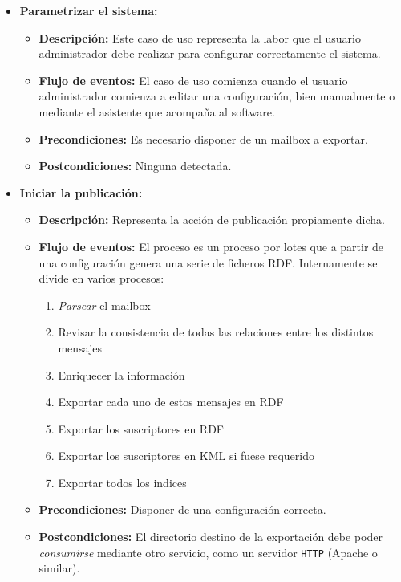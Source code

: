 \begin{itemize}

  \item \textbf{Parametrizar el sistema:}
 	\begin{itemize}
 	  \item \textbf{Descripción:} Este caso de uso representa la labor 
		que el usuario administrador debe realizar para configurar 
		correctamente el sistema.
 	  \item \textbf{Flujo de eventos:} El caso de uso comienza cuando el
		usuario administrador comienza a editar una configuración, 
		bien manualmente o mediante el asistente que acompaña al 
		software.
	  \item \textbf{Precondiciones:} Es necesario disponer de un mailbox
		a exportar.
	  \item \textbf{Postcondiciones:} Ninguna detectada.
	\end{itemize}

  \item \textbf{Iniciar la publicación:}
 	\begin{itemize}
 	  \item \textbf{Descripción:} Representa la acción de publicación 
		propiamente dicha.
 	  \item \textbf{Flujo de eventos:} El proceso es un proceso por 
		lotes que a partir de una configuración genera una serie 
		de ficheros RDF. Internamente se divide en varios procesos:
		\begin{enumerate}
		 \item \emph{Parsear} el mailbox
		 \item Revisar la consistencia de todas las relaciones entre los distintos mensajes
		 \item Enriquecer la información
		 \item Exportar cada uno de estos mensajes en RDF
		 \item Exportar los suscriptores en RDF
		 \item Exportar los suscriptores en KML si fuese requerido
		 \item Exportar todos los indices
		\end{enumerate}
	  \item \textbf{Precondiciones:} Disponer de una configuración correcta.
	  \item \textbf{Postcondiciones:} El directorio destino de la exportación
		debe poder \emph{consumirse} mediante otro servicio, como un 
		servidor \texttt{HTTP} (Apache o similar).
	\end{itemize}


\end{itemize}
